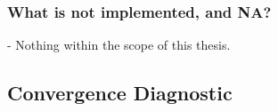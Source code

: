 \documentclass[article]{jss}
\begin{document}
\subsubsection{What is not implemented, and NA?}

- Nothing within the scope of this thesis.

\subsection{Convergence Diagnostic} \label{sec:convergence}


\end{document}
